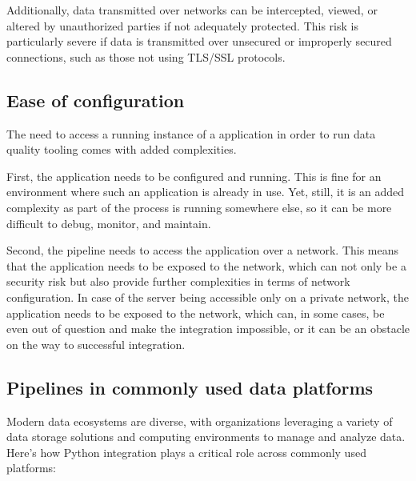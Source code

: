 Additionally, data transmitted over networks can be intercepted, viewed, or altered by unauthorized parties if not adequately protected. This risk is particularly severe if data is transmitted over unsecured or improperly secured connections, such as those not using TLS/SSL protocols. 

\subsection{Ease of configuration}

The need to access a running instance of a  application in order to run data quality tooling comes with added complexities.

First, the application needs to be configured and running. This is fine for an environment where such an application is already in use. Yet, still, it is an added complexity as part of the process is running somewhere else, so it can be more difficult to debug, monitor, and maintain.

Second, the pipeline needs to access the application over a network. This means that the application needs to be exposed to the network, which can not only be a security risk but also provide further complexities in terms of network configuration. In case of the server being accessible only on a private network, the application needs to be exposed to the network, which can, in some cases, be even out of question and make the integration impossible, or it can be an obstacle on the way to successful integration.

\subsection{Pipelines in commonly used data platforms}

Modern data ecosystems are diverse, with organizations leveraging a variety of data storage solutions and computing environments to manage and analyze data. Here’s how Python integration plays a critical role across commonly used platforms:

